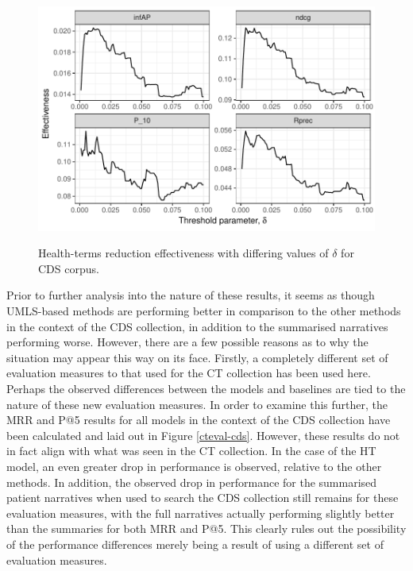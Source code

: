 \documentclass[a4paper]{report}
\begin{document}
\begin{figure}
\centering
\caption{Health-terms reduction effectiveness with differing values of $\delta$ for CDS corpus.}
\includegraphics[width=.9\columnwidth]{cdshtmodel.pdf}
\label{fig:cdsht_results}
\end{figure}

Prior to further analysis into the nature of these results, it seems as though UMLS-based methods are performing better in comparison to the other methods in the context of the CDS collection, in addition to the summarised narratives performing worse. However, there are a few possible reasons as to why the situation may appear this way on its face. Firstly, a completely different set of evaluation measures to that used for the CT collection has been used here. Perhaps the observed differences between the models and baselines are tied to the nature of these new evaluation measures. In order to examine this further, the MRR and P@5 results for all models in the context of the CDS collection have been calculated and laid out in Figure \ref{cteval-cds}. However, these results do not in fact align with what was seen in the CT collection. In the case of the HT model, an even greater drop in performance is observed, relative to the other methods. In addition, the observed drop in performance for the summarised patient narratives when used to search the CDS collection still remains for these evaluation measures, with the full narratives actually performing slightly better than the summaries for both MRR and P@5. This clearly rules out the possibility of the performance differences merely being a result of using a different set of evaluation measures.
\end{document}
